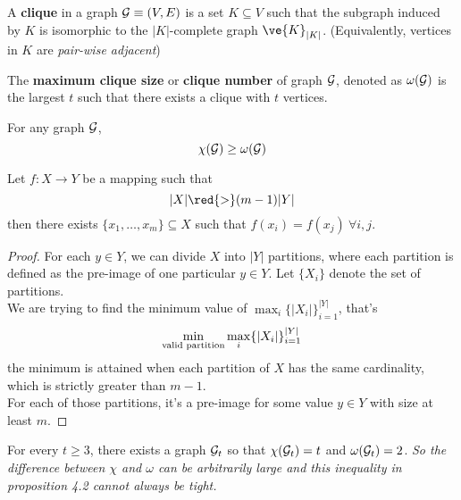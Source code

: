 \documentclass{article}
\begin{document}
			\begin{definition}
				A \textbf{clique} in a graph $\mathcal{{G}} \equiv (V, E)$ is a set $K \subseteq V$ such that the subgraph induced by $K$ is isomorphic to the $|K|$-complete graph $\ve{K}_{|K|}$. (Equivalently, vertices in $K$ are \emph{pair-wise adjacent})
			\end{definition}
			
			\begin{definition}
				The \textbf{maximum clique size} or \textbf{clique number} of graph $\mathcal{{G}}$, denoted as $\omega(\mathcal{{G}})$ is the largest $t$ such that there exists a clique with $t$ vertices.
			\end{definition}
			
			\begin{proposition}
				For any graph $\mathcal{{G}}$, 
				\begin{equation}
					\chi(\mathcal{{G}}) \geq \omega(\mathcal{{G}})
				\end{equation}
			\end{proposition}
			
			\begin{proposition}
				Let $f: X \to Y$ be a mapping such that 
				\begin{equation}
					|X| \red{>} (m-1)|Y|
				\end{equation}
				then there exists $\{x_1, \dots, x_m\} \subseteq X$ such that $f(x_i) = f(x_j)\ \forall i, j$.
				\begin{proof}
					For each $y \in Y$, we can divide $X$ into $|Y|$ partitions, where each partition is defined as the pre-image of one particular $y \in Y$. Let $\{X_i\}$ denote the set of partitions. \\
					We are trying to find the minimum value of $\max_i\{|X_i|\}_{i=1}^{|Y|}$, that's
					\begin{equation}
						\min_{\text{{valid partition}}} \max_i\{|X_i|\}_{i=1}^{|Y|}
					\end{equation}
					the minimum is attained when each partition of $X$ has the same cardinality, which is strictly greater than $m-1$. \\
					For each of those partitions, it's a pre-image for some value $y \in Y$ with size at least $m$.
				\end{proof}
			\end{proposition}
			
			\begin{proposition}
				For every $t \geq 3$, there exists a graph $\mathcal{{G}}_t$ so that $\chi(\mathcal{{G}}_t) = t$ and $\omega(\mathcal{{G}}_t) = 2$. \emph{So the difference between $\chi$ and $\omega$ can be arbitrarily large and this inequality in proposition 4.2 cannot always be tight.}
			\end{proposition}
			
\end{document}
